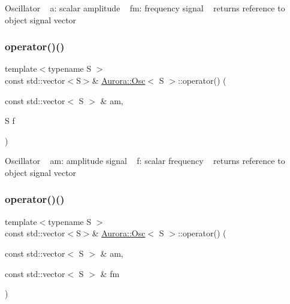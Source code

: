 Oscillator ~\newline
a\+: scalar amplitude ~\newline
fm\+: frequency signal ~\newline
returns reference to object signal vector \mbox{\label{class_aurora_1_1_osc_a28fe97e5634b8a02474657ed456c326b}} 
\subsubsection{\texorpdfstring{operator()()}{operator()()}\hspace{0.1cm}{\footnotesize\ttfamily [3/4]}}
{\footnotesize\ttfamily template$<$typename S $>$ \\
const std\+::vector$<$S$>$\& \hyperlink{class_aurora_1_1_osc}{Aurora\+::\+Osc}$<$ S $>$\+::operator() (\begin{DoxyParamCaption}\item[{const std\+::vector$<$ S $>$ \&}]{am,  }\item[{S}]{f }\end{DoxyParamCaption})\hspace{0.3cm}{\ttfamily [inline]}}

Oscillator ~\newline
am\+: amplitude signal ~\newline
f\+: scalar frequency ~\newline
returns reference to object signal vector \mbox{\label{class_aurora_1_1_osc_a06f9ead5fbf828f7ebb8617ac6cb24b4}} 
\subsubsection{\texorpdfstring{operator()()}{operator()()}\hspace{0.1cm}{\footnotesize\ttfamily [4/4]}}
{\footnotesize\ttfamily template$<$typename S $>$ \\
const std\+::vector$<$S$>$\& \hyperlink{class_aurora_1_1_osc}{Aurora\+::\+Osc}$<$ S $>$\+::operator() (\begin{DoxyParamCaption}\item[{const std\+::vector$<$ S $>$ \&}]{am,  }\item[{const std\+::vector$<$ S $>$ \&}]{fm }\end{DoxyParamCaption})\hspace{0.3cm}{\ttfamily [inline]}}

